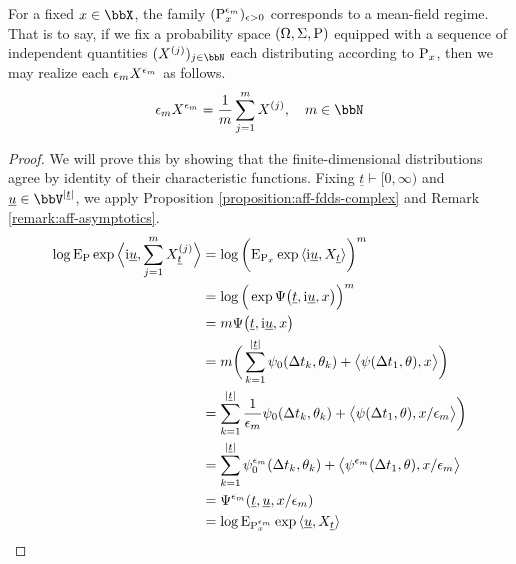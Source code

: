\begin{proposition}
  \label{proposition:mean-field-asymptotics}
  For a fixed $\stateVar \in \stateSpace$, the family $({\operatorname{P}}^{\epsilon_m}_x)_{\epsilon>0}$ corresponds to a mean-field regime.
  That is to say, if we fix a probability space $(\Omega, \Sigma, {\operatorname{P}})$ equipped with a sequence of independent quantities $(\X^{(j)})_{j\in\bbN}$ each distributing according to ${\operatorname{P}}_x$,
  then we may realize each $\epsilon_m X^{\epsilon_m}$ as follows.
  \begin{equation*}
    \epsilon_m \X^{\epsilon_m} = \frac1m \sum_{j=1}^m \X^{(j)}, \quad m \in \bbN
  \end{equation*}
\end{proposition}
\begin{proof}
  \label{proof:proposition:mean-field-asymptotics}
  We will prove this by showing that the finite-dimensional distributions agree by identity of their characteristic functions.
  Fixing $\underline t \vdash [0,\infty)$ and $\underline\momentVar \in \vecSpace^{|\underline t|}$, we apply Proposition \ref{proposition:aff-fdds-complex} and Remark \ref{remark:aff-asymptotics}.
  \begin{align*}
    \log{\operatorname{E}}_{\operatorname{P}}\exp{\Big\langle {\rm i}\underline{u}, \sum_{j=1}^m X^{(j)}_{\underline t} \Big\rangle}
    &= \log\bigg({\operatorname{E}}_{{\operatorname{P}}_x}\exp{\langle {\rm i}\underline{u}, X_{\underline t} \rangle} \bigg)^m \\
    &= \log\Big(\exp\Psi\big(\underline t, {\rm i}\underline{u}, x \big) \Big)^m \\
    &=  m \Psi\big(\underline t, {\rm i}\underline{u}, x \big)  \\
    &= m \bigg( \sum_{k=1}^{|\underline t|} \psi_0(\Delta t_k, \theta_k) + {\big\langle \psi(\Delta t_1, \theta) , x \big\rangle} \bigg)  \\
    &= \sum_{k=1}^{|\underline t|} \frac{1}{\epsilon_m}\psi_0(\Delta t_k, \theta_k) + {\big\langle \psi(\Delta t_1, \theta) , x/\epsilon_m \big\rangle} \bigg)  \\
    &= \sum_{k=1}^{|\underline t|} \psi^{\epsilon_m}_0(\Delta t_k, \theta_k) + {\big\langle \psi^{\epsilon_m}(\Delta t_1, \theta) , x/\epsilon_m \big\rangle}  \\
    &= \Psi^{\epsilon_m}(\underline t, \underline{u}, x/\epsilon_m) \\
    &= \log{\operatorname{E}}_{{\operatorname{P}}^{\epsilon_m}_x} \exp{\langle \underline{u}, X_{\underline t} \rangle}
  \end{align*}
\end{proof}
